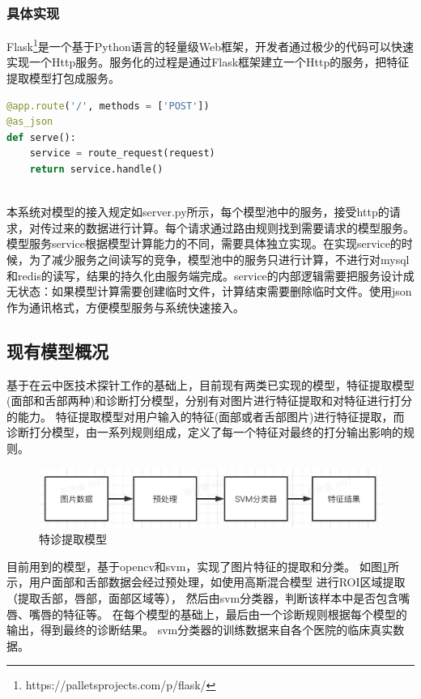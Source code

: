\subsubsection{具体实现}
Flask\footnote{https://palletsprojects.com/p/flask/}是一个基于Python语言的轻量级Web框架，开发者通过极少的代码可以快速实现一个Http服务。服务化的过程是通过Flask框架建立一个Http的服务，把特征提取模型打包成服务。

\begin{lstlisting}[language={Python}, title=server.py]
@app.route('/', methods = ['POST'])
@as_json
def serve():
    service = route_request(request)
    return service.handle()
    
\end{lstlisting}

本系统对模型的接入规定如server.py所示，每个模型池中的服务，接受http的请求，对传过来的数据进行计算。每个请求通过路由规则找到需要请求的模型服务。模型服务service根据模型计算能力的不同，需要具体独立实现。在实现service的时候，为了减少服务之间读写的竞争，模型池中的服务只进行计算，不进行对mysql和redis的读写，结果的持久化由服务端完成。service的内部逻辑需要把服务设计成无状态：如果模型计算需要创建临时文件，计算结束需要删除临时文件。使用json作为通讯格式，方便模型服务与系统快速接入。



\subsection{现有模型概况}
基于在云中医技术探针工作的基础上，目前现有两类已实现的模型，特征提取模型(面部和舌部两种)和诊断打分模型，分别有对图片进行特征提取和对特征进行打分的能力。
特征提取模型对用户输入的特征(面部或者舌部图片)进行特征提取，而诊断打分模型，由一系列规则组成，定义了每一个特征对最终的打分输出影响的规则。

\begin{figure}[ht]
    \centering
    \includegraphics[width=15cm]{images/model.png}
    \caption{特诊提取模型}
    \label{fig:my_model}
\end{figure}
目前用到的模型，基于opencv和svm，实现了图片特征的提取和分类。
如图\ref{fig:my_model}所示，用户面部和舌部数据会经过预处理，如使用高斯混合模型\cite{Hu2016Robust} 进行ROI区域提取（提取舌部，唇部，面部区域等），
然后由svm分类器，判断该样本中是否包含嘴唇、嘴唇的特征等。
在每个模型的基础上，最后由一个诊断规则根据每个模型的输出，得到最终的诊断结果。
svm分类器的训练数据来自各个医院的临床真实数据。

